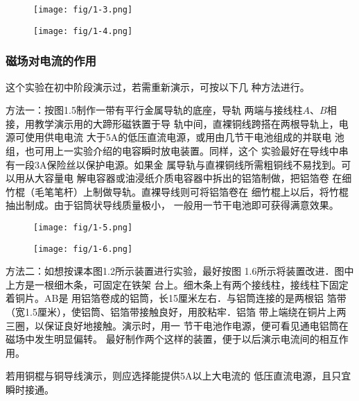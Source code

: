 \begin{figure}[htp]\centering
    \begin{minipage}[t]{0.48\textwidth}
    \centering
\texttt{[image: fig/1-3.png]}
    \caption{}
    \end{minipage}
    \begin{minipage}[t]{0.48\textwidth}
    \centering
\texttt{[image: fig/1-4.png]}
    \caption{}
    \end{minipage}
    \end{figure}

\subsubsection{磁场对电流的作用}
这个实验在初中阶段演示过，若需重新演示，可按以下几
种方法进行。


方法一：按图1.5制作一带有平行金属导轨的底座，导轨
两端与接线柱$A$、$B$相接，用教学演示用的大蹄形磁铁置于导
轨中间，直裸铜线跨搭在两根导轨上，电源可使用供电电流
大于5A的低压直流电源，或用由几节干电池组成的并联电
池组，也可用上一实验介绍的电容瞬时放电装置。同样，这个
实验最好在导线中串有一段3A保险丝以保护电源。如果金
属导轨与直裸铜线所需粗铜线不易找到。可以用从大容量电
解电容器或油浸纸介质电容器中拆出的铝箔制做，把铝箔卷
在细竹棍（毛笔笔杆）上制做导轨。直裸导线则可将铝箔卷在
细竹棍上以后，将竹棍抽出制成。由于铝筒状导线质量极小，
一般用一节干电池即可获得满意效果。

\begin{figure}[htp]\centering
    \begin{minipage}[t]{0.48\textwidth}
    \centering
\texttt{[image: fig/1-5.png]}
    \caption{}
    \end{minipage}
    \begin{minipage}[t]{0.48\textwidth}
    \centering
\texttt{[image: fig/1-6.png]}
    \caption{}
    \end{minipage}
    \end{figure}

方法二：如想按课本图1.2所示装置进行实验，最好按图
1.6所示将装置改进．图中上方是一根细木条，可固定在铁架
台上。细木条上有两个接线柱，接线柱下固定着铜片。AB是
用铝箔卷成的铝筒，长15厘米左右．与铝筒连接的是两根铝
箔带（宽1.5厘米），使铝筒、铝箔带接触良好，用胶粘牢．铝箔
带上端绕在铜片上两三圈，以保证良好地接触。演示时，用一
节干电池作电源，便可看见通电铝筒在磁场中发生明显偏转。
最好制作两个这样的装置，便于以后演示电流间的相互作用。

若用铜棍与铜导线演示，则应选择能提供5A以上大电流的
低压直流电源，且只宜瞬时接通。

